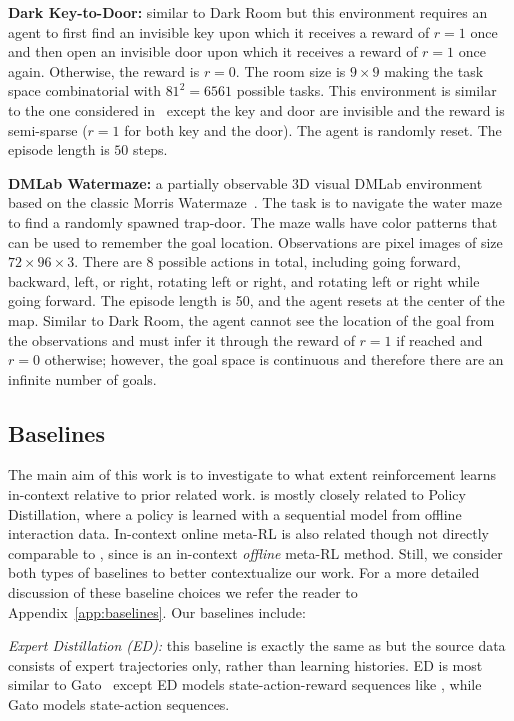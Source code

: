 {\bf Dark Key-to-Door:} similar to Dark Room but this environment requires an agent to first find an invisible key upon which it receives a reward of $r=1$ once and then open an invisible door upon which it receives a reward of $r=1$ once again. Otherwise, the reward is $r=0$. The room size is $9\times 9$ making the task space combinatorial with $81^2=6561$ possible tasks. This environment is similar to the one considered in~\citet{chen2021dt} except the key and door are invisible and the reward is semi-sparse ($r=1$ for both key and the door). The agent is randomly reset. The episode length is $50$ steps.


{\bf DMLab Watermaze:} a partially observable 3D visual DMLab environment based on the classic Morris Watermaze~\citep{morris1981watermaze}. The task is to navigate the water maze to find a randomly spawned trap-door. The maze walls have color patterns that can be used to remember the goal location. Observations are pixel images of size $72\times96\times3$. There are 8 possible actions in total, including going forward, backward, left, or right, rotating left or right, and rotating left or right while going forward. The episode length is 50, and the agent resets at the center of the map. Similar to Dark Room, the agent cannot see the location of the goal from the observations and must infer it through the reward of $r=1$ if reached and $r=0$ otherwise; however, the goal space is continuous and therefore there are an infinite number of goals.


\subsection{Baselines}
\label{subsec:experimental-setup:baselines}

    The main aim of this work is to investigate to what extent \name reinforcement learns in-context relative to prior related work. \name is mostly closely related to Policy Distillation, where a policy is learned with a sequential model from offline interaction data. In-context online meta-RL is also related though not directly comparable to \namenospace, since \name is an in-context \emph{offline} meta-RL method. Still, we consider both types of baselines to better contextualize our work. For a more detailed discussion of these baseline choices we refer the reader to Appendix~\ref{app:baselines}. Our baselines include:


{\it Expert Distillation (ED):}  this baseline is exactly the same as \name but the source data consists of expert trajectories only, rather than learning histories. ED is most similar to Gato~\citep{reed2022gato} except ED models state-action-reward sequences like \namenospace, while Gato models state-action sequences. 

